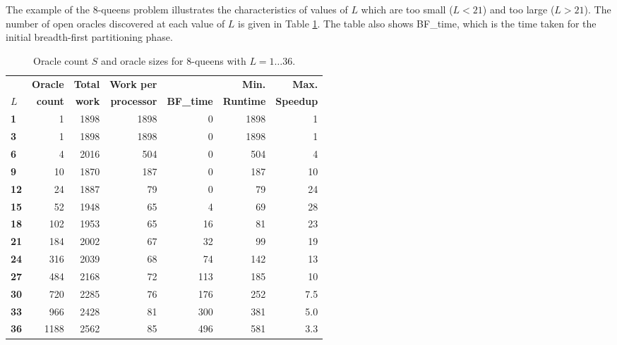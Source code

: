 The example of the 8-queens problem illustrates the characteristics of values of $L$ which
are too small ($L<21$) and too large ($L>21$).  The number of open oracles discovered at
each value of $L$ is given in Table \ref{q8_orc_counts}.  The table also shows BF\_{}time,
which is the time taken for the initial breadth-first partitioning phase.

\begin{table}[htb]
{\small
\begin{tabular}{| l | r | r | r | r | r | r |}
\hline
             & \textbf{Oracle} & \textbf{Total} & \textbf{Work per}  &                     & \textbf{Min.}    & \textbf{Max.}    \\
\textbf{$L$} & \textbf{count}  & \textbf{work}  & \textbf{processor} & \textbf{BF\_{}time} & \textbf{Runtime} & \textbf{Speedup} \\
\hline
\textbf{1}   &    1            & 1898           & 1898               &  0                  & 1898             & 1 \\
\textbf{3}   &    1            & 1898           & 1898               &  0                  & 1898             & 1 \\
\textbf{6}   &    4            & 2016           &  504               &  0                  &  504             & 4 \\
\textbf{9}   &   10            & 1870           &  187               &  0                  &  187             & 10 \\
\textbf{12}  &   24            & 1887           &   79               &  0                  &   79             & 24 \\
\textbf{15}  &   52            & 1948           &   65               &  4                  &   69             & 28 \\
\textbf{18}  &  102            & 1953           &   65               &  16                 &   81             & 23 \\
\textbf{21}  &  184            & 2002           &   67               &  32                 &   99             & 19 \\
\textbf{24}  &  316            & 2039           &   68               &  74                 &  142             & 13 \\
\textbf{27}  &  484            & 2168           &   72               & 113                 &  185              & 10 \\
\textbf{30}  &  720            & 2285           &   76               & 176                 &  252             & 7.5 \\
\textbf{33}  &  966            & 2428           &   81               & 300                 &  381             & 5.0 \\
\textbf{36}  & 1188            & 2562           &   85               & 496                 &  581             & 3.3 \\
\hline
\end{tabular}
}
\caption{Oracle count $S$ and oracle sizes for 8-queens with $L=1\ldots 36$.}
\label{q8_orc_counts}
\end{table}

